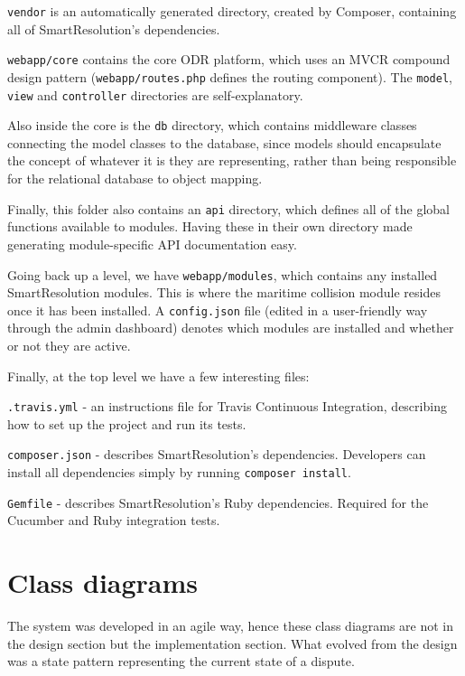 \lstinline{vendor} is an automatically generated directory, created by Composer, containing all of SmartResolution's dependencies.

\lstinline{webapp/core} contains the core ODR platform, which uses an MVCR compound design pattern (\lstinline{webapp/routes.php} defines the routing component). The \lstinline{model}, \lstinline{view} and \lstinline{controller} directories are self-explanatory.

Also inside the core is the \lstinline{db} directory, which contains middleware classes connecting the model classes to the database, since models should encapsulate the concept of whatever it is they are representing, rather than being responsible for the relational database to object mapping.

Finally, this folder also contains an \lstinline{api} directory, which defines all of the global functions available to modules. Having these in their own directory made generating module-specific API documentation easy.

Going back up a level, we have \lstinline{webapp/modules}, which contains any installed SmartResolution modules. This is where the maritime collision module resides once it has been installed. A \lstinline{config.json} file (edited in a user-friendly way through the admin dashboard) denotes which modules are installed and whether or not they are active.

Finally, at the top level we have a few interesting files:

\lstinline{.travis.yml} - an instructions file for Travis Continuous Integration, describing how to set up the project and run its tests.

\lstinline{composer.json} - describes SmartResolution's dependencies. Developers can install all dependencies simply by running \lstinline{composer install}.

\lstinline{Gemfile} - describes SmartResolution's Ruby dependencies. Required for the Cucumber and Ruby integration tests.

\section{Class diagrams}

The system was developed in an agile way, hence these class diagrams are not in the design section but the implementation section. What evolved from the design was a state pattern representing the current state of a dispute.

